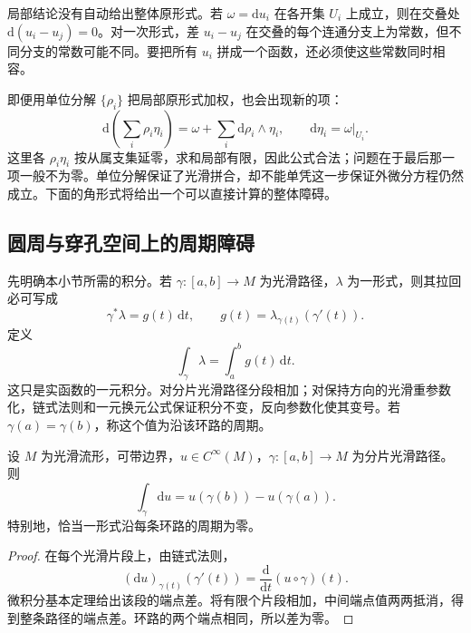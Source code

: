 局部结论没有自动给出整体原形式。若 \(\omega=\mathrm{d}u_i\) 在各开集 \(U_i\) 上成立，则在交叠处 \(\mathrm{d}(u_i-u_j)=0\)。对一次形式，差 \(u_i-u_j\) 在交叠的每个连通分支上为常数，但不同分支的常数可能不同。要把所有 \(u_i\) 拼成一个函数，还必须使这些常数同时相容。

\ProseParagraphBreak

即便用单位分解 \(\{\rho_i\}\) 把局部原形式加权，也会出现新的项：
\[
	\mathrm{d}\left(\sum_i\rho_i\eta_i\right)
	=\omega+\sum_i\mathrm{d}\rho_i\wedge\eta_i,
	\qquad \mathrm{d}\eta_i=\omega|_{U_i}.
\]
这里各 \(\rho_i\eta_i\) 按从属支集延零，求和局部有限，因此公式合法；问题在于最后那一项一般不为零。单位分解保证了光滑拼合，却不能单凭这一步保证外微分方程仍然成立。下面的角形式将给出一个可以直接计算的整体障碍。

\subsection{圆周与穿孔空间上的周期障碍}
\label{g1:subsec:1402:04}

先明确本小节所需的积分。若 \(\gamma:[a,b]\to M\) 为光滑路径，\(\lambda\) 为一形式，则其拉回必可写成
\[
	\gamma^*\lambda=g(t)\,\mathrm{d}t,\qquad
	g(t)=\lambda_{\gamma(t)}(\gamma'(t)).
\]
定义
\[
	\int_\gamma\lambda=\int_a^b g(t)\,\mathrm{d}t.
\]
这只是实函数的一元积分。对分片光滑路径分段相加；对保持方向的光滑重参数化，链式法则和一元换元公式保证积分不变，反向参数化使其变号。若 \(\gamma(a)=\gamma(b)\)，称这个值为沿该环路的周期。

\begin{lemma}
	\label{g1:lem:exact-path-period}
	设 \(M\) 为光滑流形，可带边界，\(u\in C^\infty(M)\)，\(\gamma:[a,b]\to M\) 为分片光滑路径。则
	\[
		\int_\gamma\mathrm{d}u=u(\gamma(b))-u(\gamma(a)).
	\]
	特别地，恰当一形式沿每条环路的周期为零。
\end{lemma}
\begin{proof}
	在每个光滑片段上，由链式法则，
	\[
		(\mathrm{d}u)_{\gamma(t)}(\gamma'(t))
		=\frac{\mathrm{d}}{\mathrm{d}t}(u\circ\gamma)(t).
	\]
	微积分基本定理给出该段的端点差。将有限个片段相加，中间端点值两两抵消，得到整条路径的端点差。环路的两个端点相同，所以差为零。
\end{proof}

